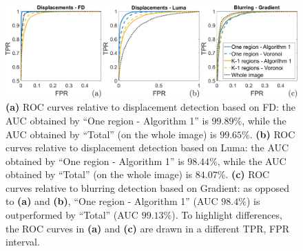 \documentclass{llncs}
\begin{document}
\begin{figure}[t]
\centering
\includegraphics[width=1\linewidth]{Immagini/curve}
\caption{\textbf{(a)} ROC curves relative to displacement detection based on FD: the AUC obtained by 
``One region - Algorithm 1'' is $99.89\%$, while the AUC obtained by ``Total'' (on the whole 
image) is $99.65\%$.
\textbf{(b)} ROC curves relative to displacement detection based on Luma: the AUC obtained by 
``One region - Algorithm 1'' is $98.44\%$, while the AUC obtained by ``Total'' (on the whole 
image) is $84.07\%$.
\textbf{(c)} ROC curves relative to blurring detection based on Gradient: as opposed to \textbf{(a)} and 
\textbf{(b)}, ``One region - Algorithm 1'' (AUC $98.4\%$) is outperformed by ``Total'' (AUC $99.13\%$).
To highlight differences, the ROC curves in \textbf{(a)} and \textbf{(c)} are drawn in a different TPR, FPR interval.}
\label{fig:ROC}
\end{figure}
\end{document}
